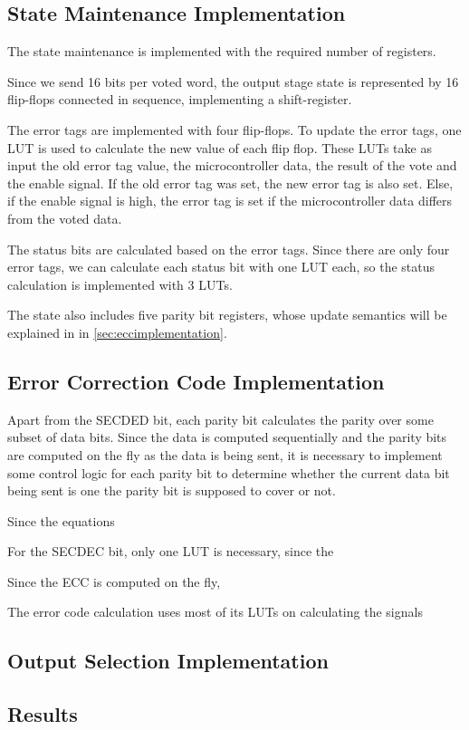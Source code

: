 \subsection{State Maintenance Implementation}
The state maintenance is implemented with the required number of
registers. 

Since we send 16 bits per voted word, the output stage
state is represented by 16 flip-flops connected in sequence,
implementing a shift-register. 

The error tags are implemented with four flip-flops. To update the
error tags, one LUT is used to calculate the new value of each flip
flop. These LUTs take as input the old error tag value, the
microcontroller data, the result of the vote and the enable signal. If
the old error tag was set, the new error tag is also set. Else, if the
enable signal is high, the error tag is set if the microcontroller
data differs from the voted data.

The status bits are calculated based on the error tags. Since there
are only four error tags, we can calculate each status bit with one
LUT each, so the status calculation is implemented with 3 LUTs. 

The state also includes five parity bit registers, whose update
semantics will be explained in in \autoref{sec:eccimplementation}.

\subsection{Error Correction Code Implementation}
\label{sec:eccimplementation}
Apart from the SECDED bit, each parity bit calculates the parity over
some subset of data bits. Since the data is computed sequentially and
the parity bits are computed on the fly as the data is being sent, it
is necessary to implement some control logic for each parity bit to
determine whether the current data bit being sent is one the parity
bit is supposed to cover or not. 

Since the equations 

For the SECDEC bit, only one LUT is necessary, since the 

Since the ECC is computed on the fly, 

The error code calculation uses most of its LUTs on calculating the
signals

\subsection{Output Selection Implementation}

\subsection{Results}

